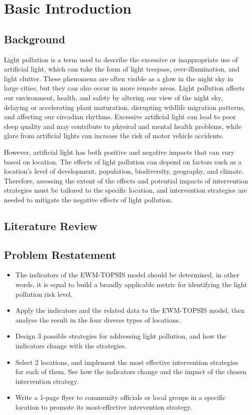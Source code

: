 \MinParskip{}

\section{Basic Introduction}

\subsection{Background}
Light pollution is a term used to describe the excessive or inappropriate use of artificial light, which can take the form of light trespass, over-illumination, and light clutter. These phenomena are often visible as a glow in the night sky in large cities, but they can also occur in more remote areas. Light pollution affects our environment, health, and safety by altering our view of the night sky, delaying or accelerating plant maturation, disrupting wildlife migration patterns, and affecting our circadian rhythms. Excessive artificial light can lead to poor sleep quality and may contribute to physical and mental health problems, while glare from artificial lights can increase the risk of motor vehicle accidents.

However, artificial light has both positive and negative impacts that can vary based on location. The effects of light pollution can depend on factors such as a location's level of development, population, biodiversity, geography, and climate. Therefore, assessing the extent of the effects and potential impacts of intervention strategies must be tailored to the specific location, and intervention strategies are needed to mitigate the negative effects of light pollution.

\subsection{Literature Review}


\subsection{Problem Restatement}
\begin{itemize}
    \item The indicators of the EWM-TOPSIS model should be determined, in other words, it is equal to build a broadly applicable metric for identifying the light pollution risk level.
    \item Apply the indicators and the related data to the EWM-TOPSIS model, then analyse the result in the four diverse types of locations.
    \item Design 3 possible strategies for addressing light pollution, and how the indicators change with the strategies.
    \item Select 2 locations, and implement the most effective intervention strategies for each of them. See how the indicators change and the impact of the chosen intervention strategy.
    \item Write a 1-page flyer to community officials or local groups in a specific location to promote its most-effective intervention strategy.
\end{itemize}

